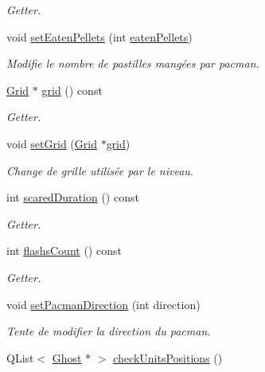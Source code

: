 \begin{DoxyCompactItemize}
\begin{DoxyCompactList}\small\item\em Getter. \end{DoxyCompactList}\item 
void \hyperlink{class_level_af6c4d0af3e4e22bb2e543d03e39e68ac}{set\+Eaten\+Pellets} (int \hyperlink{class_level_a22e230e7ff4e40ae092534caafda9060}{eaten\+Pellets})
\begin{DoxyCompactList}\small\item\em Modifie le nombre de pastilles mangées par pacman. \end{DoxyCompactList}\item 
\hyperlink{class_grid}{Grid} $\ast$ \hyperlink{class_level_a61c34c5c6db8f96276fdb87ceaf3d879}{grid} () const 
\begin{DoxyCompactList}\small\item\em Getter. \end{DoxyCompactList}\item 
void \hyperlink{class_level_af43ddfbd5b7b08adc65cf88989280800}{set\+Grid} (\hyperlink{class_grid}{Grid} $\ast$\hyperlink{class_level_a61c34c5c6db8f96276fdb87ceaf3d879}{grid})
\begin{DoxyCompactList}\small\item\em Change de grille utilisée par le niveau. \end{DoxyCompactList}\item 
int \hyperlink{class_level_a870e37a0f1b58e8f0b7beb9819e8cc54}{scared\+Duration} () const 
\begin{DoxyCompactList}\small\item\em Getter. \end{DoxyCompactList}\item 
int \hyperlink{class_level_a002203a9fd3f9ea736af7e940602775c}{flashs\+Count} () const 
\begin{DoxyCompactList}\small\item\em Getter. \end{DoxyCompactList}\item 
void \hyperlink{class_level_a56e0184447f4469d5c13f08577b5c3f9}{set\+Pacman\+Direction} (int direction)
\begin{DoxyCompactList}\small\item\em Tente de modifier la direction du pacman. \end{DoxyCompactList}\item 
Q\+List$<$ \hyperlink{class_ghost}{Ghost} $\ast$ $>$ \hyperlink{class_level_a89da34148d40923b1a1448efd9e68486}{check\+Units\+Positions} ()

\end{DoxyCompactItemize}
